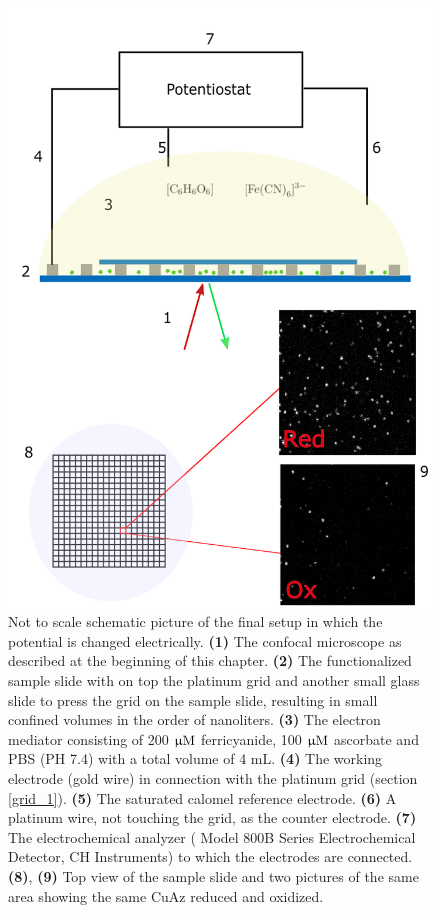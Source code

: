 \documentclass[twoside,single]{lion-msc}
\begin{document}
\begin{figure}[ht!]
\centering
\includegraphics[width=.75 \textwidth]{final_setup}
\caption{Not to scale schematic picture of the final setup in which the potential is changed electrically. \textbf{(1)} The confocal microscope as described at the beginning of this chapter. \textbf{(2)} The functionalized sample slide with on top the platinum grid and another small glass slide to press the grid on the sample slide, resulting in small confined volumes in the order of nanoliters. \textbf{(3)} The electron mediator consisting of 200 $\upmu \textup{M}$ ferricyanide, 100 $\upmu \textup{M}$ ascorbate and PBS (PH 7.4) with a total volume of 4 mL. \textbf{(4)} The working electrode (gold wire) in connection with the platinum grid (section \ref{grid_1}). \textbf{(5)} The saturated calomel reference electrode. \textbf{(6)} A platinum wire, not touching the grid, as the counter electrode. \textbf{(7)} The electrochemical analyzer ( Model 800B Series Electrochemical Detector, CH Instruments) to which the electrodes are connected. \textbf{(8)}, \textbf{(9)} Top view of the sample slide and two pictures of the same area showing the same CuAz reduced and oxidized.}
\label{final_setup}
\end{figure}
\end{document}
